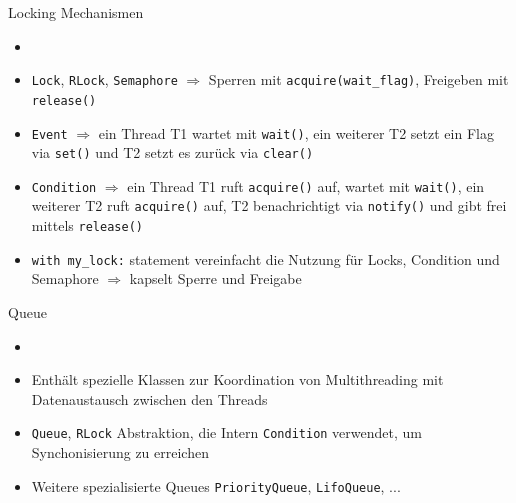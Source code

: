 \begin{frame}{Locking Mechanismen}
     \begin{itemize}
        \setlength{\itemindent}{2.5in}
        \item [\textbf{Locking Mechanismen aus threading Modul}] 
    \end{itemize}
    \begin{itemize}
        \item \texttt{Lock}, \texttt{RLock}, \texttt{Semaphore} $\Rightarrow$  Sperren mit  \texttt{acquire(wait\_flag)}, Freigeben mit  \texttt{release()}
        \item \texttt{Event} $\Rightarrow$ ein Thread T1 wartet mit \texttt{wait()}, ein weiterer T2 setzt ein Flag via \texttt{set()}  und  T2 setzt es zurück via \texttt{clear()}
        \item \texttt{Condition} $\Rightarrow$ ein Thread T1 ruft  \texttt{acquire()} auf, wartet mit \texttt{wait()}, ein weiterer T2 ruft  \texttt{acquire()} auf,  T2 benachrichtigt via \texttt{notify()} und gibt frei mittels \texttt{release()}
        \item \texttt{with my\_lock:} statement vereinfacht die Nutzung für Locks, Condition und Semaphore $\Rightarrow$ kapselt Sperre und Freigabe
       \end{itemize}

\end{frame}


\begin{frame}{Queue}
  \begin{itemize}
        \setlength{\itemindent}{1.0in}
        \item [\textbf{Das queue Modul}] 
    \end{itemize}
    \begin{itemize}
        \item Enthält spezielle Klassen zur Koordination von Multithreading mit Datenaustausch zwischen den Threads
        \item \texttt{Queue}, \texttt{RLock} Abstraktion, die Intern \texttt{Condition} verwendet, um Synchonisierung zu erreichen
        \item Weitere spezialisierte Queues  \texttt{PriorityQueue}, \texttt{LifoQueue}, ...
    \end{itemize}

\end{frame}

